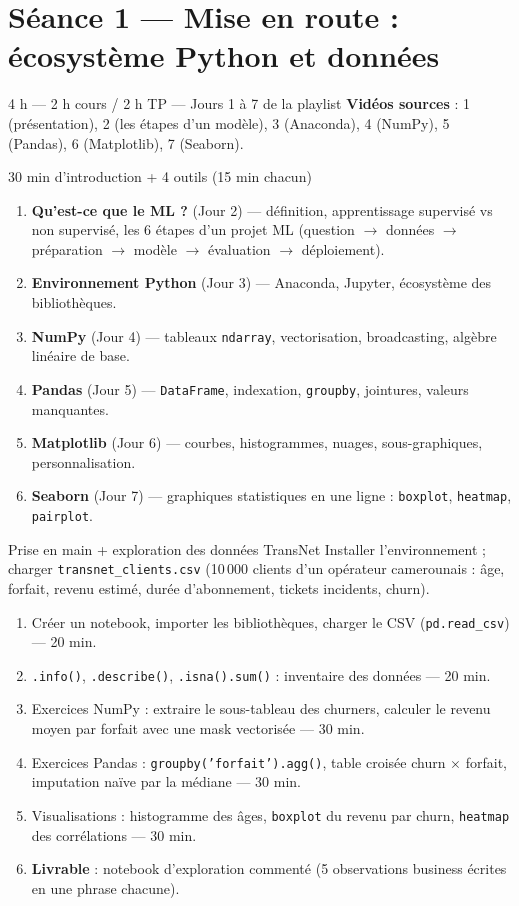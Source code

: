 \documentclass[11pt,a4paper]{article}
\begin{document}
\newpage
\section*{Séance 1 — Mise en route : écosystème Python et données}
\begin{seancebox}{4 h — 2 h cours / 2 h TP — Jours 1 à 7 de la playlist}
\textbf{Vidéos sources} : 1 (présentation), 2 (les étapes d'un modèle), 3 (Anaconda), 4 (NumPy), 5 (Pandas), 6 (Matplotlib), 7 (Seaborn).
\end{seancebox}
\begin{coursbox}{30 min d'introduction + 4 outils (15 min chacun)}
\begin{enumerate}[nosep]
\item \textbf{Qu'est-ce que le ML ?} (Jour 2) — définition, apprentissage supervisé vs non supervisé, les 6 étapes d'un projet ML (question $\to$ données $\to$ préparation $\to$ modèle $\to$ évaluation $\to$ déploiement).
\item \textbf{Environnement Python} (Jour 3) — Anaconda, Jupyter, écosystème des bibliothèques.
\item \textbf{NumPy} (Jour 4) — tableaux \texttt{ndarray}, vectorisation, broadcasting, algèbre linéaire de base.
\item \textbf{Pandas} (Jour 5) — \texttt{DataFrame}, indexation, \texttt{groupby}, jointures, valeurs manquantes.
\item \textbf{Matplotlib} (Jour 6) — courbes, histogrammes, nuages, sous-graphiques, personnalisation.
\item \textbf{Seaborn} (Jour 7) — graphiques statistiques en une ligne : \texttt{boxplot}, \texttt{heatmap}, \texttt{pairplot}.
\end{enumerate}
\end{coursbox}
\begin{tpbox}{Prise en main + exploration des données TransNet}
Installer l'environnement ; charger \texttt{transnet\_clients.csv} (10\,000 clients d'un opérateur camerounais : âge, forfait, revenu estimé, durée d'abonnement, tickets incidents, churn).
\begin{enumerate}[nosep]
\item Créer un notebook, importer les bibliothèques, charger le CSV (\texttt{pd.read\_csv}) — 20 min.
\item \texttt{.info()}, \texttt{.describe()}, \texttt{.isna().sum()} : inventaire des données — 20 min.
\item Exercices NumPy : extraire le sous-tableau des churners, calculer le revenu moyen par forfait avec une mask vectorisée — 30 min.
\item Exercices Pandas : \texttt{groupby('forfait').agg()}, table croisée churn $\times$ forfait, imputation naïve par la médiane — 30 min.
\item Visualisations : histogramme des âges, \texttt{boxplot} du revenu par churn, \texttt{heatmap} des corrélations — 30 min.
\item \textbf{Livrable} : notebook d'exploration commenté (5 observations business écrites en une phrase chacune).
\end{enumerate}
\end{tpbox}
\end{document}
